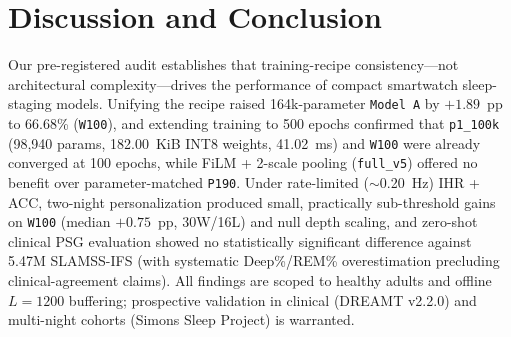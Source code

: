 \documentclass[journal]{IEEEtran}
\begin{document}
\section{Discussion and Conclusion}
Our pre-registered audit establishes that training-recipe consistency---not architectural complexity---drives the performance of compact smartwatch sleep-staging models. Unifying the recipe raised 164k-parameter \texttt{Model~A} by $+1.89$~pp to 66.68\% (\texttt{W100}), and extending training to 500 epochs confirmed that \texttt{p1\_100k} (98,940 params, 182.00~KiB INT8 weights, 41.02~ms) and \texttt{W100} were already converged at 100 epochs, while FiLM + 2-scale pooling (\texttt{full\_v5}) offered no benefit over parameter-matched \texttt{P190}. Under rate-limited ($\sim$0.20~Hz) IHR + ACC, two-night personalization produced small, practically sub-threshold gains on \texttt{W100} (median $+0.75$~pp, 30W/16L) and null depth scaling, and zero-shot clinical PSG evaluation showed no statistically significant difference against 5.47M SLAMSS-IFS (with systematic Deep\%/REM\% overestimation precluding clinical-agreement claims). All findings are scoped to healthy adults and offline $L=1200$ buffering; prospective validation in clinical (DREAMT v2.2.0) and multi-night cohorts (Simons Sleep Project) is warranted.
\end{document}
